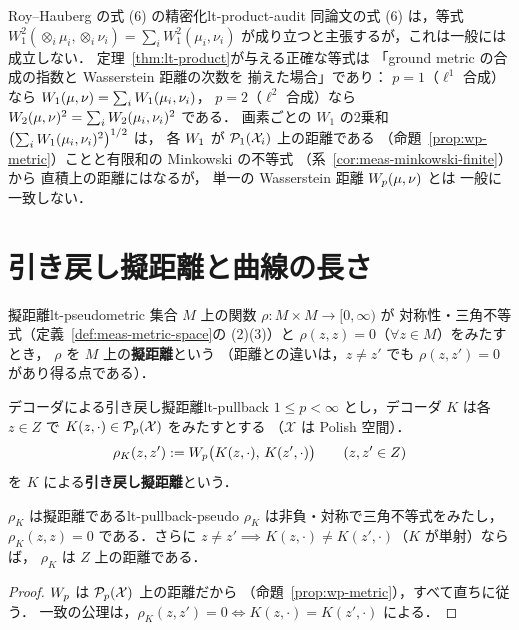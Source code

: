 \begin{remark}{Roy--Hauberg の式 (6) の精密化}{lt-product-audit}
  同論文の式 (6) は，等式
  $W_1^2(\otimes_i\mu_i,\otimes_i\nu_i)=\sum_iW_1^2(\mu_i,\nu_i)$
  が成り立つと主張するが，これは一般には成立しない．
  定理~\ref{thm:lt-product}が与える正確な等式は
  「ground metric の合成の指数と Wasserstein 距離の次数を
  揃えた場合」であり：
  $p=1$（$\ell^1$ 合成）なら
  $W_1(\mu,\nu)=\sum_iW_1(\mu_i,\nu_i)$，
  $p=2$（$\ell^2$ 合成）なら
  $W_2(\mu,\nu)^2=\sum_iW_2(\mu_i,\nu_i)^2$ である．
  画素ごとの $W_1$ の2乗和
  $\bigl(\sum_iW_1(\mu_i,\nu_i)^2\bigr)^{1/2}$ は，
  各 $W_1$ が $\mathcal{P}_{1}(\mathcal{X}_i)$ 上の距離である
  （命題~\ref{prop:wp-metric}）ことと有限和の Minkowski の不等式
  （系~\ref{cor:meas-minkowski-finite}）から
  直積上の距離にはなるが，
  単一の Wasserstein 距離 $W_p(\mu,\nu)$ とは
  一般に一致しない．
\end{remark}

\section{引き戻し擬距離と曲線の長さ}
\label{sec:lt-pullback}

\begin{definition}{擬距離}{lt-pseudometric}
  集合 $M$ 上の関数 $\rho\colon M\times M\to[0,\infty)$ が
  対称性・三角不等式（定義~\ref{def:meas-metric-space}の (2)(3)）と
  $\rho(z,z)=0$（$\forall z\in M$）をみたすとき，
  $\rho$ を $M$ 上の\textbf{擬距離}という
  （距離との違いは，$z\neq z'$ でも $\rho(z,z')=0$ があり得る点である）．
\end{definition}

\begin{definition}{デコーダによる引き戻し擬距離}{lt-pullback}
  $1\leq p<\infty$ とし，デコーダ $K$ は各 $z\in Z$ で
  $K(z,\cdot)\in\mathcal{P}_{p}(\mathcal{X})$ をみたすとする
  （$\mathcal{X}$ は Polish 空間）．
  \[
    \rho_K(z,z'):=W_p\bigl(K(z,\cdot),\,K(z',\cdot)\bigr)
    \qquad(z,z'\in Z)
  \]
  を $K$ による\textbf{引き戻し擬距離}という．
\end{definition}

\begin{claim}{$\rho_K$ は擬距離である}{lt-pullback-pseudo}
  $\rho_K$ は非負・対称で三角不等式をみたし，
  $\rho_K(z,z)=0$ である．さらに
  $z\neq z'\implies K(z,\cdot)\neq K(z',\cdot)$（$K$ が単射）ならば，
  $\rho_K$ は $Z$ 上の距離である．
\end{claim}

\begin{proof}
  $W_p$ は $\mathcal{P}_{p}(\mathcal{X})$ 上の距離だから
  （命題~\ref{prop:wp-metric}），すべて直ちに従う．
  一致の公理は，$\rho_K(z,z')=0\iff K(z,\cdot)=K(z',\cdot)$ による．
\end{proof}

